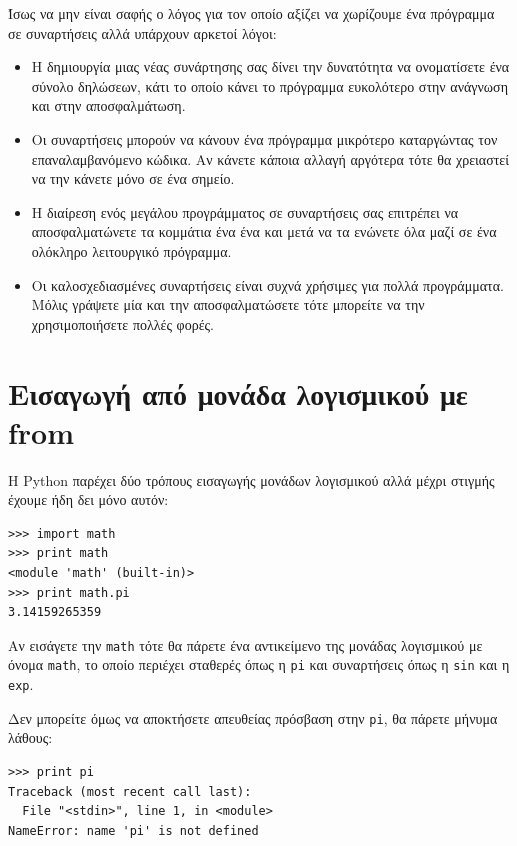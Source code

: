 \documentclass[10pt]{book}
\begin{document}
Ίσως να μην είναι σαφής ο λόγος για τον οποίο αξίζει να χωρίζουμε
ένα πρόγραμμα σε συναρτήσεις αλλά υπάρχουν αρκετοί λόγοι:


\begin{itemize}

\item Η δημιουργία μιας νέας συνάρτησης σας δίνει την δυνατότητα να ονοματίσετε 
ένα σύνολο δηλώσεων, κάτι το οποίο κάνει το πρόγραμμα ευκολότερο στην ανάγνωση
και στην αποσφαλμάτωση.


\item Οι συναρτήσεις μπορούν να κάνουν ένα πρόγραμμα μικρότερο καταργώντας
τον επαναλαμβανόμενο κώδικα. Αν κάνετε κάποια αλλαγή αργότερα τότε θα χρειαστεί
να την κάνετε μόνο σε ένα σημείο.


\item Η διαίρεση ενός μεγάλου προγράμματος σε συναρτήσεις σας επιτρέπει να
αποσφαλματώνετε τα κομμάτια ένα ένα και μετά να τα ενώνετε όλα μαζί 
σε ένα ολόκληρο λειτουργικό πρόγραμμα.


\item Οι καλοσχεδιασμένες συναρτήσεις είναι συχνά χρήσιμες για πολλά προγράμματα. Μόλις γράψετε μία και την αποσφαλματώσετε τότε μπορείτε να την χρησιμοποιήσετε πολλές φορές.


\end{itemize}


\section{Εισαγωγή από μονάδα λογισμικού με from}

Η Python παρέχει δύο τρόπους εισαγωγής μονάδων λογισμικού αλλά 
μέχρι στιγμής έχουμε ήδη δει μόνο αυτόν:


\begin{verbatim}
>>> import math
>>> print math
<module 'math' (built-in)>
>>> print math.pi
3.14159265359
\end{verbatim}
%

Αν εισάγετε την {\tt math} τότε θα πάρετε ένα αντικείμενο της μονάδας λογισμικού με όνομα {\tt math}, το οποίο περιέχει σταθερές όπως η {\tt pi} 
και συναρτήσεις όπως η {\tt sin} και η {\tt exp}.

Δεν μπορείτε όμως να αποκτήσετε απευθείας πρόσβαση στην {\tt pi}, 
θα πάρετε μήνυμα λάθους:


\begin{verbatim}
>>> print pi
Traceback (most recent call last):
  File "<stdin>", line 1, in <module>
NameError: name 'pi' is not defined
\end{verbatim}
%
\end{document}
